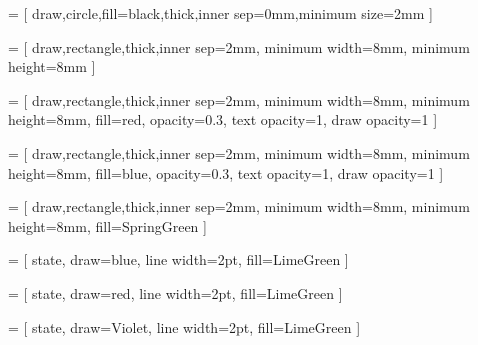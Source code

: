   = 
[
	draw,circle,fill=black,thick,inner sep=0mm,minimum size=2mm
]

  =
[
	draw,rectangle,thick,inner sep=2mm,
	minimum width=8mm, minimum height=8mm
]

 = 
[
	draw,rectangle,thick,inner sep=2mm,
	minimum width=8mm, minimum height=8mm,
	fill=red, opacity=0.3, text opacity=1, draw opacity=1
]

 = 
[
	draw,rectangle,thick,inner sep=2mm,
	minimum width=8mm, minimum height=8mm,
	fill=blue, opacity=0.3, text opacity=1, draw opacity=1
]

 = 
[
	draw,rectangle,thick,inner sep=2mm,
	minimum width=8mm, minimum height=8mm,
	fill=SpringGreen
]

  = 
[
	state, draw=blue, line width=2pt,
	fill=LimeGreen
]

  = 
[
	state, draw=red, line width=2pt,
	fill=LimeGreen
]

  = 
[
	state, draw=Violet, line width=2pt,
	fill=LimeGreen
]
